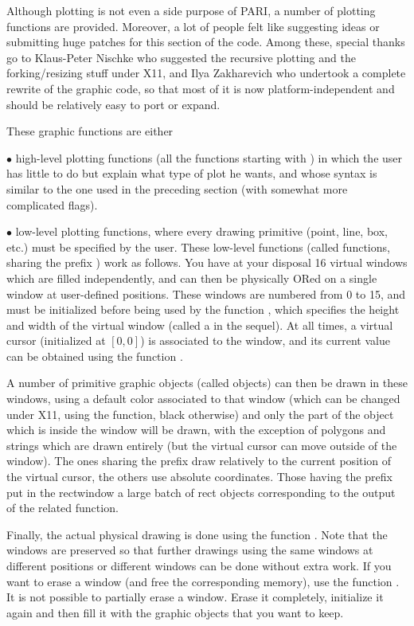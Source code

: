   Although plotting is not even a side purpose of PARI, a number of plotting
functions are provided. Moreover, a lot of people felt like suggesting
ideas or submitting huge patches for this section of the code. Among these,
special thanks go to Klaus-Peter Nischke who suggested the recursive plotting
and the forking/resizing stuff under X11, and Ilya Zakharevich who
undertook a complete rewrite of the graphic code, so that most of it is now
platform-independent and should be relatively easy to port or expand.

These graphic functions are either

$\bullet$ high-level plotting functions (all the functions starting with
) in which the user has little to do but explain what type of plot
he wants, and whose syntax is similar to the one used in the preceding
section (with somewhat more complicated flags).

$\bullet$ low-level plotting functions, where every drawing primitive (point,
line, box, etc.) must be specified by the user. These low-level functions
(called  functions, sharing the prefix ) work as
follows. You have at your disposal 16 virtual windows which are filled
independently, and can then be physically ORed on a single window at
user-defined positions. These windows are numbered from 0 to 15, and must be
initialized before being used by the function , which specifies
the height and width of the virtual window (called a  in the
sequel). At all times, a virtual cursor (initialized at $[0,0]$) is
associated to the window, and its current value can be obtained using the
function .

  A number of primitive graphic objects (called  objects) can then
be drawn in these windows, using a default color associated to that window
(which can be changed under X11, using the  function, black
otherwise) and only the part of the object which is inside the window will be
drawn, with the exception of polygons and strings which are drawn entirely
(but the virtual cursor can move outside of the window). The ones sharing the
prefix  draw relatively to the current position of the virtual
cursor, the others use absolute coordinates. Those having the prefix
 put in the rectwindow a large batch of rect objects
corresponding to the output of the related  function.

   Finally, the actual physical drawing is done using the function
. Note that the windows are preserved so that further drawings
using the same windows at different positions or different windows can be
done without extra work. If you want to erase a window (and free the
corresponding memory), use the function . It is not possible to
partially erase a window. Erase it completely, initialize it again and then
fill it with the graphic objects that you want to keep.

